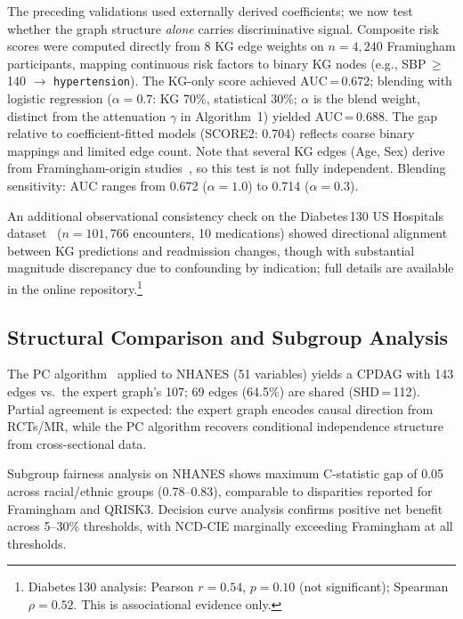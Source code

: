 \documentclass[runningheads]{llncs}
\begin{document}
The preceding validations used externally derived coefficients;
we now test whether the graph structure \emph{alone} carries
discriminative signal.
Composite risk scores were computed directly from 8 KG edge weights
on $n = 4{,}240$ Framingham participants, mapping continuous risk
factors to binary KG nodes
(e.g., SBP\,$\geq$\,140 $\to$ \texttt{hypertension}).
The KG-only score achieved AUC\,=\,0.672; blending with logistic
regression ($\alpha\!=\!0.7$: KG 70\%, statistical 30\%;
$\alpha$ is the blend weight, distinct from the attenuation
$\gamma$ in Algorithm~1) yielded AUC\,=\,0.688.
The gap relative to coefficient-fitted models (SCORE2: 0.704)
reflects coarse binary mappings and limited edge count.
Note that several KG edges (Age, Sex) derive from
Framingham-origin studies~\cite{dagostino2008}, so this test is
not fully independent.
Blending sensitivity: AUC ranges from 0.672 ($\alpha\!=\!1.0$)
to 0.714 ($\alpha\!=\!0.3$).

An additional observational consistency check on the Diabetes\,130
US Hospitals dataset~\cite{strack2014diabetes130}
($n\!=\!101{,}766$ encounters, 10 medications) showed directional
alignment between KG predictions and readmission changes, though
with substantial magnitude discrepancy due to confounding by
indication; full details are available in the online
repository.\footnote{Diabetes\,130 analysis: Pearson $r = 0.54$,
$p = 0.10$ (not significant); Spearman $\rho = 0.52$.
This is associational evidence only.}

\subsection{Structural Comparison and Subgroup Analysis}\label{sec:pcalg}

The PC algorithm~\cite{spirtes2000causation} applied to NHANES
(51 variables) yields a CPDAG with 143 edges vs.\ the expert graph's
107; 69 edges (64.5\%) are shared (SHD\,=\,112).
Partial agreement is expected: the expert graph encodes causal
direction from RCTs/MR, while the PC algorithm recovers conditional
independence structure from cross-sectional data.

Subgroup fairness analysis on NHANES shows maximum C-statistic gap of
0.05 across racial/ethnic groups (0.78--0.83), comparable to
disparities reported for Framingham and QRISK3.
Decision curve analysis confirms positive net benefit across
5--30\% thresholds, with NCD-CIE marginally exceeding Framingham
at all thresholds.

\end{document}
